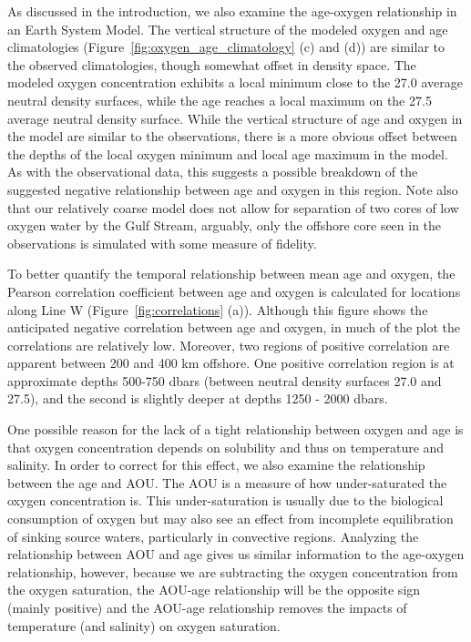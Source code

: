As discussed in the introduction, we also examine the age-oxygen relationship in
an Earth System Model. The vertical structure of the modeled oxygen and age
climatologies (Figure~\ref{fig:oxygen_age_climatology} (c) and (d)) are similar
to the observed climatologies, though somewhat offset in density space. The
modeled oxygen concentration exhibits a local minimum close to the 27.0 average
neutral density surfaces, while the age reaches a local maximum on the 27.5
average neutral density surface. While the vertical structure of age and oxygen
in the model are similar to the observations, there is a more obvious offset
between the depths of the local oxygen minimum and local age maximum in the model.
As with the observational data, this suggests a possible breakdown of the suggested
negative relationship between age and oxygen in this region. Note also that our
relatively coarse model does not allow for separation of two cores of low oxygen
water by the Gulf Stream, arguably, only the offshore core seen in the observations
is simulated with some measure of fidelity.

To better quantify the temporal relationship between mean age and oxygen, the
Pearson correlation coefficient between age and oxygen is calculated for
locations along Line W (Figure~\ref{fig:correlations} (a)).  Although this figure shows the anticipated
negative correlation between age and oxygen, in much of the plot the correlations
are relatively low.  Moreover, two regions of positive correlation are apparent
between 200 and 400 km offshore. One positive correlation region is at approximate
depths 500-750 dbars (between neutral density surfaces 27.0 and 27.5), and the
second is slightly deeper at depths 1250 - 2000 dbars.

One possible reason for the lack of a tight relationship between oxygen and age
is that oxygen concentration depends on solubility and thus on temperature and
salinity. In order to correct for this effect, we also examine the relationship
between the age and AOU. The AOU is a measure of how under-saturated the oxygen
concentration is. This under-saturation is usually due to the biological
consumption of oxygen but may also see an effect from incomplete equilibration
of sinking source waters, particularly in convective regions. Analyzing the
relationship between AOU and age gives us similar information to the age-oxygen
relationship, however, because we are subtracting the oxygen concentration from
the oxygen saturation, the AOU-age relationship will be the opposite sign
(mainly positive) and the AOU-age relationship removes the impacts of temperature
(and salinity) on oxygen saturation.

